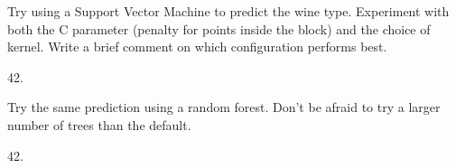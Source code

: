\documentclass[
  coursecode={CMPE 251},
  assignmentname={Exercise \exercisenumber},
  studentnumber=20053722,
  name={Bryan Hoang}
]{
  ltxanswer%
}
\begin{document}
  \begin{questions}
    \question[2]{}
    Try using a Support Vector Machine to predict the wine type. Experiment with both the C parameter (penalty for points inside the block) and the choice of kernel. Write a brief comment on which configuration performs best.
    \begin{solution}
      42.
    \end{solution}

    \question[2]{}
    Try the same prediction using a random forest. Don't be afraid to try a larger number of trees than the default.
    \begin{solution}
      42.
    \end{solution}
  \end{questions}
\end{document}
